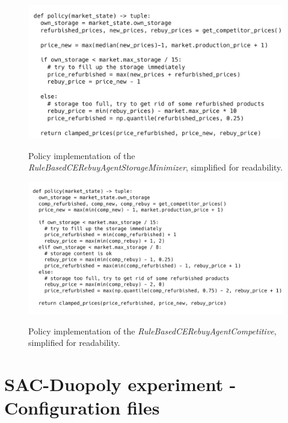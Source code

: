 \begin{figure}[ht]
	\includegraphics[width = \textwidth]{images/policies/RuleBasedCERebuyAgentStorageMinimizerPolicy.png}\\
	\caption{Policy implementation of the \emph{RuleBasedCERebuyAgentStorageMinimizer}, simplified for readability.}\label{fig:PolicyRuleBasedStorageMinmizer}
\end{figure}

\begin{figure}[!]
	\includegraphics[width = \textwidth]{images/policies/RuleBasedCERebuyAgentCompetitivePolicy.png}\\
	\caption{Policy implementation of the \emph{RuleBasedCERebuyAgentCompetitive}, simplified for readability.}\label{fig:PolicyRuleBasedCompetitive}
\end{figure}

\clearpage
\section*{SAC-Duopoly experiment - Configuration files}

